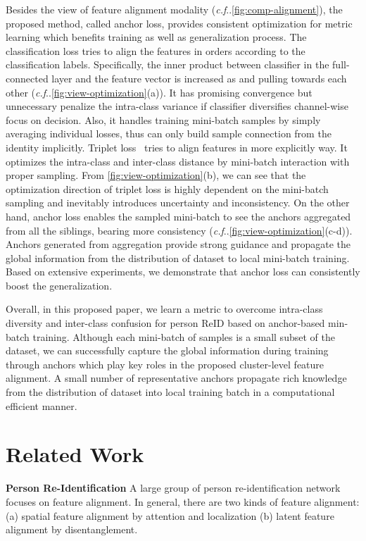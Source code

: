 \documentclass[runningheads]{llncs}
\makeatletter
\DeclareRobustCommand\onedot{\futurelet\@let@token\@onedot}
\def\@onedot{\ifx\@let@token.\else.\null\fi\xspace}
\def\cf{\emph{c.f}\onedot} \def\Cf{\emph{C.f}\onedot}
\makeatother
\begin{document}
Besides the view of feature alignment modality (\cf \cref{fig:comp-alignment}), the proposed method, called anchor loss, provides consistent optimization for metric learning which benefits training as well as generalization process. 
The classification loss tries to align the features in orders according to the classification labels. Specifically, the inner product  between classifier  in the full-connected layer and the feature vector  is increased as  and  pulling towards each other (\cf \cref{fig:view-optimization}(a)). It has promising convergence but unnecessary penalize the intra-class variance if classifier diversifies channel-wise focus on decision. Also, it handles training mini-batch samples by simply averaging individual losses, thus can only build sample connection from the identity implicitly. 
Triplet loss~\cite{hermans-triplethard} tries to align features in more explicitly way. It optimizes the intra-class and inter-class distance by mini-batch interaction with proper sampling. From \cref{fig:view-optimization}(b), we can see that the optimization direction of triplet loss is highly dependent on the mini-batch sampling and inevitably introduces uncertainty and inconsistency. On the other hand, anchor loss enables the sampled mini-batch to see the anchors  aggregated from all the siblings, bearing more consistency (\cf \cref{fig:view-optimization}(c-d)). Anchors generated from aggregation provide strong guidance and propagate the global information from the distribution of dataset to local mini-batch training.  
Based on extensive experiments, we demonstrate that anchor loss can consistently boost the generalization.

Overall, in this proposed paper, we learn a metric to overcome intra-class diversity and inter-class confusion for person ReID based on anchor-based min-batch training. Although each mini-batch of samples is a small subset of the dataset, we can successfully capture the global information during training through anchors which play key roles in the proposed cluster-level feature alignment. A small number of representative anchors propagate rich knowledge from the distribution of dataset into local training batch in a computational efficient manner.  


\section{Related Work}\label{sec:related_work}

\textbf{Person Re-Identification}
A large group of person re-identification network focuses on feature alignment.
In general, there are two kinds of feature alignment: (a) spatial feature alignment by attention and localization (b) latent feature alignment by disentanglement.
\end{document}
